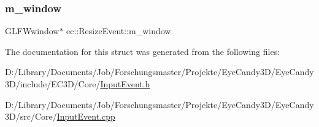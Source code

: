 \subsubsection{\texorpdfstring{m\+\_\+window}{m\_window}}
{\footnotesize\ttfamily G\+L\+F\+Wwindow$\ast$ ec\+::\+Resize\+Event\+::m\+\_\+window}



The documentation for this struct was generated from the following files\+:\begin{DoxyCompactItemize}
\item 
D\+:/\+Library/\+Documents/\+Job/\+Forschungsmaster/\+Projekte/\+Eye\+Candy3\+D/\+Eye\+Candy3\+D/include/\+E\+C3\+D/\+Core/\mbox{\hyperlink{_input_event_8h}{Input\+Event.\+h}}\item 
D\+:/\+Library/\+Documents/\+Job/\+Forschungsmaster/\+Projekte/\+Eye\+Candy3\+D/\+Eye\+Candy3\+D/src/\+Core/\mbox{\hyperlink{_input_event_8cpp}{Input\+Event.\+cpp}}\end{DoxyCompactItemize}
